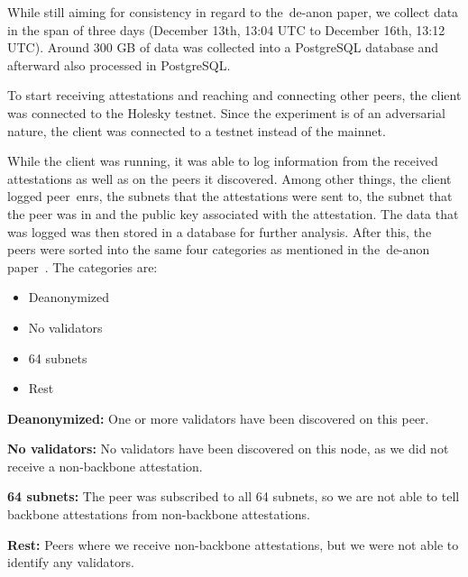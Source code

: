 While still aiming for consistency in regard to the~\gls{de-anon paper}, we collect data in the span of three days (December 13th, 13:04 UTC to December 16th, 13:12 UTC).
Around 300 GB of data was collected into a PostgreSQL database and afterward also processed in PostgreSQL\@.


To start receiving attestations and reaching and connecting other peers,
the client was connected to the Holesky testnet.
Since the experiment is of an adversarial nature, the client was connected to a testnet instead of the mainnet.

While the client was running,
it was able to log information from the received attestations as well as on the peers it discovered.
Among other things, the client logged peer~\glspl{enr}, the subnets that the attestations were sent to,
the subnet that the peer was in and the public key associated with the attestation.
The data that was logged was then stored in a database for further analysis.
After this,
the peers were sorted into the same four categories
as mentioned in the~\gls{de-anon paper}~\cite{heimbach2024deanonymizingethereumvalidatorsp2p}.
The categories are:
\begin{itemize}
    \item Deanonymized
    \item No validators
    \item 64 subnets
    \item Rest
\end{itemize}

\textbf{Deanonymized:} One or more validators have been discovered on this peer.

\textbf{No validators:} No validators have been discovered on this node, as we did not receive a non-backbone attestation.

\textbf{64 subnets:} The peer was subscribed to all 64 subnets,
so we are not able to tell backbone attestations from non-backbone attestations.

\textbf{Rest:} Peers where we receive non-backbone attestations, but we were not able to identify any validators.


